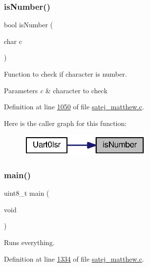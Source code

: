 \subsubsection{\texorpdfstring{isNumber()}{isNumber()}}
{\footnotesize\ttfamily bool is\+Number (\begin{DoxyParamCaption}\item[{char}]{c }\end{DoxyParamCaption})}



Function to check if character is number. 


\begin{DoxyParams}{Parameters}
{\em c} & character to check \\
\hline
\end{DoxyParams}


Definition at line \mbox{\hyperlink{satej__matthew_8c_source_l01050}{1050}} of file \mbox{\hyperlink{satej__matthew_8c_source}{satej\+\_\+matthew.\+c}}.

Here is the caller graph for this function\+:
\nopagebreak
\begin{figure}[H]
\begin{center}
\leavevmode
\includegraphics[width=188pt]{satej__matthew_8c_a65b1640156c68ea7687a41428022c1d8_icgraph}
\end{center}
\end{figure}
\mbox{\label{satej__matthew_8c_a922afd31fa147cb51a9b28ce18b3e30e}} 
\subsubsection{\texorpdfstring{main()}{main()}}
{\footnotesize\ttfamily uint8\+\_\+t main (\begin{DoxyParamCaption}\item[{void}]{ }\end{DoxyParamCaption})}



Runs everything. 



Definition at line \mbox{\hyperlink{satej__matthew_8c_source_l01334}{1334}} of file \mbox{\hyperlink{satej__matthew_8c_source}{satej\+\_\+matthew.\+c}}.

